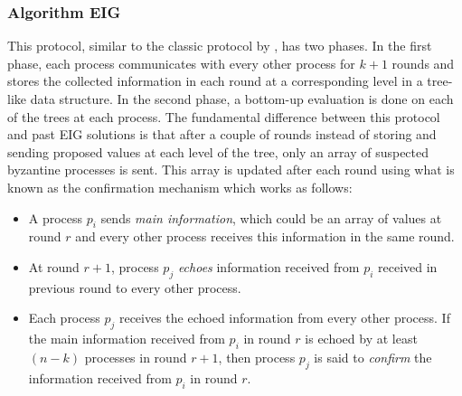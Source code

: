 \subsubsection{Algorithm EIG \cite{KM13}}
This protocol, similar to the classic protocol by \cite{Bar-NoyD91}, has two phases. In the first phase, each process communicates with every other process for $k + 1$ rounds and stores the collected information in each round at a corresponding level in a tree-like data structure. In the second phase, a bottom-up evaluation is done on each of the trees at each process. The fundamental difference between this protocol and past EIG solutions is that after a couple of rounds instead of storing and sending proposed values at each level of the tree, only an array of suspected byzantine processes is sent. This array is updated after each round using what is known as the confirmation mechanism which works as follows:
\begin{itemize}
\item A process $p_i$ sends \textit{main information}, which could be an array of values at round $r$ and every other process receives this information in the same round.
\item At round $r+1$, process $p_j$ \textit{echoes} information received from $p_i$ received in previous round to every other process. 
\item Each process $p_j$ receives the echoed information from every other process. If the main information received from $p_i$ in round $r$ is echoed by at least $(n - k)$ processes in round $r+1$, then process $p_j$ is said to \textit{confirm} the information received from $p_i$ in round $r$.
    \end{itemize}

